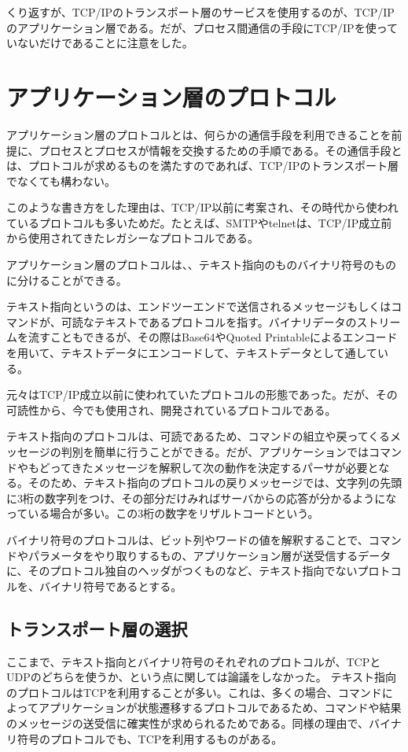 くり返すが、TCP/IPのトランスポート層のサービスを使用するのが、TCP/IPのアプリケーション層である。だが、プロセス間通信の手段にTCP/IPを使っていないだけであることに注意をした。

\section{アプリケーション層のプロトコル}

アプリケーション層のプロトコルとは、何らかの通信手段を利用できることを前提に、プロセスとプロセスが情報を交換するための手順である。その通信手段とは、プロトコルが求めるものを満たすのであれば、TCP/IPのトランスポート層でなくても構わない。

このような書き方をした理由は、TCP/IP以前に考案され、その時代から使われているプロトコルも多いためだ。たとえば、SMTPやtelnetは、TCP/IP成立前から使用されてきたレガシーなプロトコルである。

アプリケーション層のプロトコルは、、テキスト指向のものバイナリ符号のものに分けることができる。

テキスト指向というのは、エンドツーエンドで送信されるメッセージもしくはコマンドが、可読なテキストであるプロトコルを指す。バイナリデータのストリームを流すこともできるが、その際はBase64やQuoted Printableによるエンコードを用いて、テキストデータにエンコードして、テキストデータとして通している。

元々はTCP/IP成立以前に使われていたプロトコルの形態であった。だが、その可読性から、今でも使用され、開発されているプロトコルである。

テキスト指向のプロトコルは、可読であるため、コマンドの組立や戻ってくるメッセージの判別を簡単に行うことができる。だが、アプリケーションではコマンドやもどってきたメッセージを解釈して次の動作を決定するパーサが必要となる。そのため、テキスト指向のプロトコルの戻りメッセージでは、文字列の先頭に3桁の数字列をつけ、その部分だけみればサーバからの応答が分かるようになっている場合が多い。この3桁の数字をリザルトコードという。

バイナリ符号のプロトコルは、ビット列やワードの値を解釈することで、コマンドやパラメータをやり取りするもの、アプリケーション層が送受信するデータに、そのプロトコル独自のヘッダがつくものなど、テキスト指向でないプロトコルを、バイナリ符号であるとする。

\subsection{トランスポート層の選択}

ここまで、テキスト指向とバイナリ符号のそれぞれのプロトコルが、TCPとUDPのどちらを使うか、という点に関しては論議をしなかった。
テキスト指向のプロトコルはTCPを利用することが多い。これは、多くの場合、コマンドによってアプリケーションが状態遷移するプロトコルであるため、コマンドや結果のメッセージの送受信に確実性が求められるためである。同様の理由で、バイナリ符号のプロトコルでも、TCPを利用するものがある。

